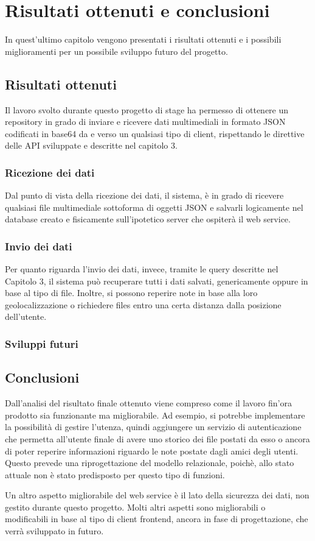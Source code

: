 \chapter{Risultati ottenuti e conclusioni}
In quest'ultimo capitolo vengono presentati i risultati ottenuti e i possibili miglioramenti per un possibile sviluppo futuro del progetto.



\section{Risultati ottenuti}
Il lavoro svolto durante questo progetto di stage ha permesso di ottenere un repository in grado di inviare e ricevere dati multimediali in formato JSON codificati in base64 da e verso un qualsiasi tipo di client, rispettando le direttive delle API sviluppate e descritte nel capitolo 3. 

\subsection{Ricezione dei dati}
Dal punto di vista della ricezione dei dati, il sistema, è in grado di ricevere qualsiasi file multimediale sottoforma di oggetti JSON e salvarli logicamente nel database creato e fisicamente sull'ipotetico server che ospiterà il web service.

\subsection{Invio dei dati}
Per quanto riguarda l'invio dei dati, invece, tramite le query descritte nel Capitolo 3, il sistema può recuperare tutti i dati salvati, genericamente oppure in base al tipo di file. Inoltre, si possono reperire note in base alla loro geolocalizzazione o richiedere files entro una certa distanza dalla posizione dell'utente.

\subsection{Sviluppi futuri}

\pagebreak
\section{Conclusioni}
Dall'analisi del risultato finale ottenuto viene compreso come il lavoro fin'ora prodotto sia funzionante ma migliorabile. 
Ad esempio, si potrebbe implementare la possibilità di gestire l'utenza, quindi aggiungere un servizio di autenticazione che permetta all'utente finale di avere uno storico dei file postati da esso o ancora di poter reperire informazioni riguardo le note postate dagli amici degli utenti. Questo prevede una riprogettazione del modello relazionale, poichè, allo stato attuale non è stato predisposto per questo tipo di funzioni.

Un altro aspetto migliorabile del web service è il lato della sicurezza dei dati, non gestito durante questo progetto.
Molti altri aspetti sono migliorabili o modificabili in base al tipo di client frontend, ancora in fase di progettazione, che verrà sviluppato in futuro.